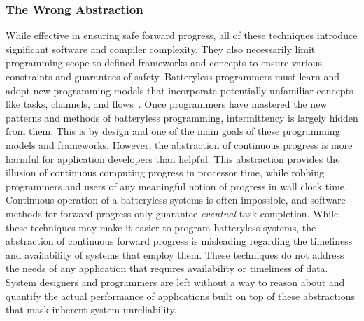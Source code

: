 \subsubsection{The Wrong Abstraction}
While effective in ensuring safe forward progress, all of these techniques introduce
significant software and compiler complexity.
They also necessarily limit programming scope to defined frameworks and concepts to ensure various constraints and guarantees of safety.
Batteryless programmers must learn and adopt new programming models that incorporate potentially unfamiliar concepts like tasks, channels, and flows~\cite{colin2016chain,maeng2017alpaca,hesterTimely17}.
Once programmers have mastered the new patterns and methods of batteryless programming, intermittency is largely hidden from them.
This is by design and one of the main goals of these programming models and frameworks.
However, the abstraction of continuous progress is more harmful for application developers than helpful.
This abstraction provides the illusion of continuous computing progress in processor time, while robbing programmers and users of any meaningful notion of progress in wall clock time.
Continuous operation of a batteryless systems is often impossible, and software methods for forward progress only guarantee \textit{eventual} task completion.
While these techniques may make it easier to program batteryless systems,
the abstraction of continuous forward progress is misleading regarding the timeliness and availability
of systems that employ them.
These techniques do not address the needs of any application that requires availability or timeliness of data.
System designers and programmers are left without a way to reason about and quantify the actual performance of applications built on top of these abstractions that mask inherent system unreliability.

